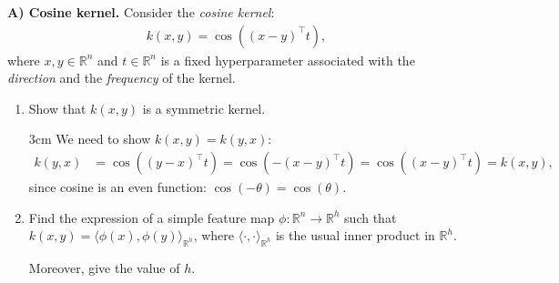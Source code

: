\textbf{A) Cosine kernel.}
Consider the \textit{cosine kernel}:
\begin{align*}
    k(x,y) = \cos ((x - y)^\top t),
\end{align*} where $x,y \in \mathbb{R}^n$ and $t \in \mathbb{R}^n$ is a fixed hyperparameter associated with the \textit{direction} and the \textit{frequency} of the kernel.
\begin{enumerate}
    \item Show that $k(x,y)$ is a symmetric kernel.
    \begin{solutionbox}{3cm}
    We need to show $k(x,y) = k(y,x)$:
    \begin{align*}
    k(y,x) &= \cos((y-x)^\top t) = \cos(-(x-y)^\top t) = \cos((x-y)^\top t) = k(x,y),
    \end{align*}
    since cosine is an even function: $\cos(-\theta) = \cos(\theta)$.
    \end{solutionbox}
    \item Find the expression of a simple feature map $\phi : \mathbb{R}^n \to \mathbb{R}^h$ such that $k(x,y) = \langle \phi(x),\phi(y) \rangle_{\mathbb{R}^h}$, where $\langle \cdot,\cdot \rangle_{\mathbb{R}^h}$ is the usual inner product in $\mathbb{R}^h$.

    Moreover, give the value of $h$.


\end{enumerate}
